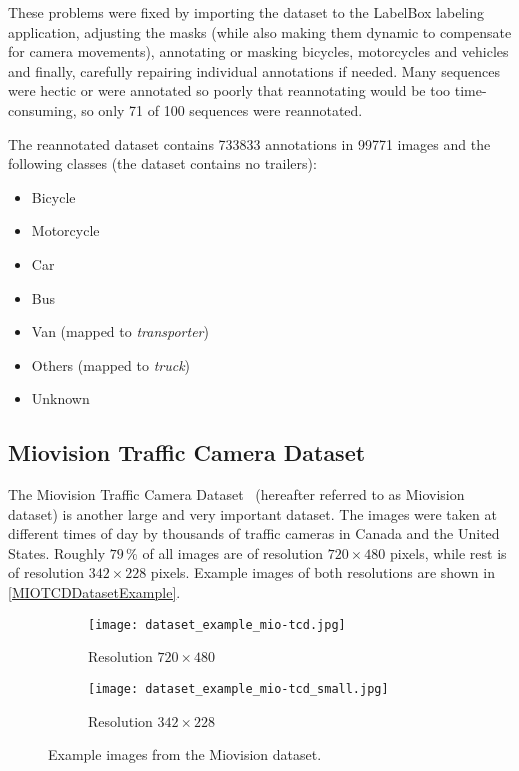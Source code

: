 These problems were fixed by importing the dataset to the LabelBox labeling
application, adjusting the masks (while also making them dynamic to compensate
for camera movements), annotating or masking bicycles, motorcycles and
 vehicles and finally, carefully repairing individual annotations if
needed. Many sequences were hectic or were annotated so poorly that reannotating
would be too time-consuming, so only 71 of 100 sequences were reannotated.

The reannotated dataset contains \num{733833} annotations in \num{99771}
images and the following classes (the dataset contains no trailers):
\begin{itemize}
    \item Bicycle
    \item Motorcycle
    \item Car
    \item Bus
    \item Van (mapped to \textit{transporter})
    \item Others (mapped to \textit{truck})
    \item Unknown
\end{itemize}


\subsection{Miovision Traffic Camera Dataset}

The Miovision Traffic Camera Dataset~\cite{MIO2018} (hereafter referred to
as Miovision dataset) is another large and very important dataset. The images
were taken at different times of day by thousands of traffic cameras in Canada
and the United States. Roughly $79\,\%$ of all images are of resolution $720
\times 480$ pixels, while rest is of
resolution $342 \times 228$ pixels. Example images of both resolutions are shown
in \autoref{MIOTCDDatasetExample}.

\begin{figure}[t]
    \centering
    \begin{subfigure}[b]{0.475\textwidth}
        \texttt{[image: dataset\_example\_mio-tcd.jpg]}
        \caption{Resolution $720 \times 480$}
    \end{subfigure}
    \begin{subfigure}[b]{0.475\textwidth}
        \texttt{[image: dataset\_example\_mio-tcd\_small.jpg]}
        \caption{Resolution $342 \times 228$}
    \end{subfigure}
    \caption{Example images from the Miovision dataset.}
    \label{MIOTCDDatasetExample}
\end{figure}

